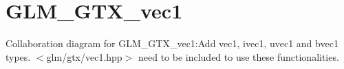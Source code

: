 \hypertarget{group__gtx__vec1}{
\section{GLM\_\-GTX\_\-vec1}
\label{group__gtx__vec1}
}


Collaboration diagram for GLM\_\-GTX\_\-vec1:Add vec1, ivec1, uvec1 and bvec1 types. $<$glm/gtx/vec1.hpp$>$ need to be included to use these functionalities.  

